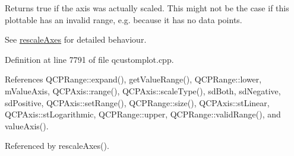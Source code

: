 Returns true if the axis was actually scaled. This might not be the case if this plottable has an invalid range, e.\+g. because it has no data points.

See \hyperlink{class_q_c_p_abstract_plottable_a7e8fc3be43c27ccacd70a7bf9d74a5cd}{rescale\+Axes} for detailed behaviour. 

Definition at line 7791 of file qcustomplot.\+cpp.



References Q\+C\+P\+Range\+::expand(), get\+Value\+Range(), Q\+C\+P\+Range\+::lower, m\+Value\+Axis, Q\+C\+P\+Axis\+::range(), Q\+C\+P\+Axis\+::scale\+Type(), sd\+Both, sd\+Negative, sd\+Positive, Q\+C\+P\+Axis\+::set\+Range(), Q\+C\+P\+Range\+::size(), Q\+C\+P\+Axis\+::st\+Linear, Q\+C\+P\+Axis\+::st\+Logarithmic, Q\+C\+P\+Range\+::upper, Q\+C\+P\+Range\+::valid\+Range(), and value\+Axis().



Referenced by rescale\+Axes().


